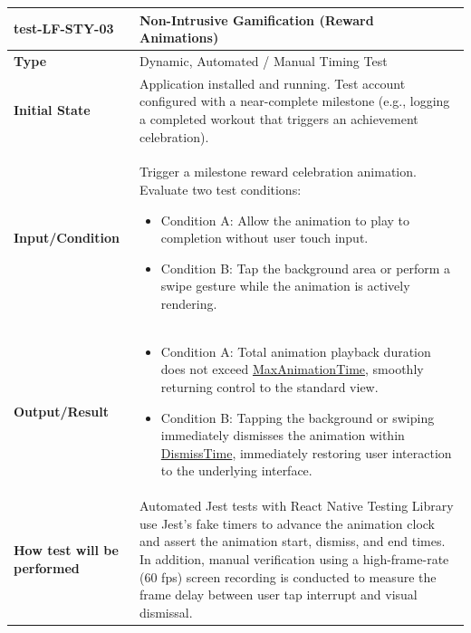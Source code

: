 \documentclass[12pt, titlepage]{article}
\newcommand{\const}[1]{\hyperlink{const:#1}{\textsf{#1}}}
\begin{document}
\noindent\begin{tabularx}{\textwidth}{>{\raggedright\arraybackslash}p{3.5cm}X}
  \toprule
  \textbf{test-LF-STY-03}\label{test:LF-STY-03} & \textbf{Non-Intrusive Gamification (Reward Animations)}\\
  \midrule
  \textbf{Type} & Dynamic, Automated / Manual Timing Test\\
  \textbf{Initial State} & Application installed and running. Test account configured with a near-complete milestone (e.g., logging a completed workout that triggers an achievement celebration).\\
  \textbf{Input/Condition} & Trigger a milestone reward celebration animation. Evaluate two test conditions:
  \begin{itemize}
    \item Condition A: Allow the animation to play to completion without user touch input.
    \item Condition B: Tap the background area or perform a swipe gesture while the animation is actively rendering.
  \end{itemize}\\
  \textbf{Output/Result} & \begin{itemize}
    \item Condition A: Total animation playback duration does not exceed \const{MaxAnimationTime}, smoothly returning control to the standard view.
    \item Condition B: Tapping the background or swiping immediately dismisses the animation within \const{DismissTime}, immediately restoring user interaction to the underlying interface.
  \end{itemize}\\
  \textbf{How test will be performed} & Automated Jest tests with React Native Testing Library use Jest's fake timers to advance the animation clock and assert the animation start, dismiss, and end times. In addition, manual verification using a high-frame-rate (60 fps) screen recording is conducted to measure the frame delay between user tap interrupt and visual dismissal.\\
  \bottomrule
\end{tabularx}

\vspace{1em}
\end{document}

